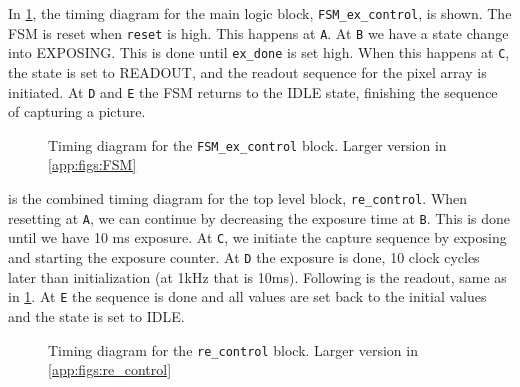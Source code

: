 In \cref{fig:res:dig:FSM}, the timing diagram for the main logic block, \texttt{FSM\_ex\_control}, is shown.
The FSM is reset when \texttt{reset} is high. This happens at \texttt{A}. At \texttt{B} we have a state change into EXPOSING. This is done until \texttt{ex\_done} is set high. 
When this happens at \texttt{C}, the state is set to READOUT, and the readout sequence for the pixel array is initiated. 
At \texttt{D} and \texttt{E} the FSM returns to the IDLE state, finishing the sequence of capturing a picture.

\begin{figure}[!htbp]
    \centering
    \caption{Timing diagram for the \texttt{FSM\_ex\_control} block. Larger version in \cref{app:figs:FSM}}
    \label{fig:res:dig:FSM}
\end{figure}

 is the combined timing diagram for the top level block, \texttt{re\_control}. 
When resetting at \texttt{A}, we can continue by decreasing the exposure time at \texttt{B}.
This is done until we have 10 ms exposure. At \texttt{C}, we initiate the capture sequence by exposing and starting the exposure counter.
At \texttt{D} the exposure is done, 10 clock cycles later than initialization (at 1kHz that is 10ms).
Following is the readout, same as in \cref{fig:res:dig:FSM}. 
At \texttt{E} the sequence is done and all values are set back to the initial values and the state is set to IDLE.

\begin{figure}[!htbp]
    \centering
    \caption{Timing diagram for the \texttt{re\_control} block. Larger version in \cref{app:figs:re_control}}
    \label{fig:res:dig:re_control}
\end{figure}